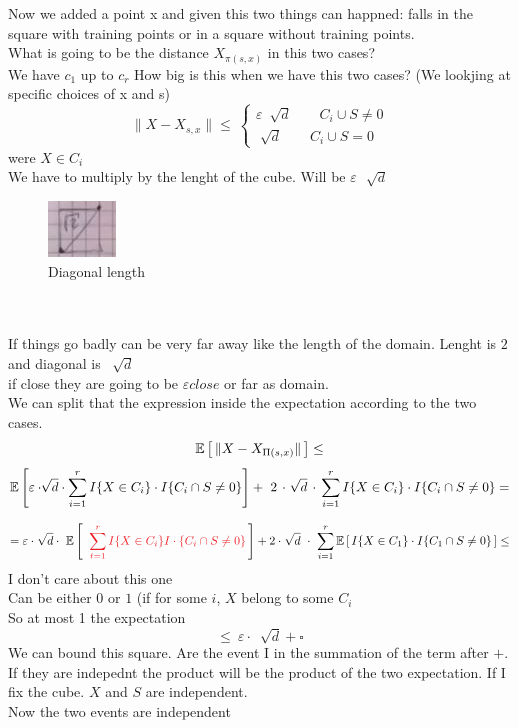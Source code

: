 \documentclass[../main.tex]{subfiles}
\begin{document}
Now we added a point x and given this two things can happned:
falls in the square with training points or in a square without training points.
\\
What is going to be the distance $X_{\pi(s,x)}$ in this two cases?
\\
We have $c_1$ up to $c_r$
How big is this when we have this two cases?
(We lookjing at specific choices of x and s)
\\
$$
\| X - X_{s,x} \| \leq \
\begin{cases}
\varepsilon \ \sqrt[]{d} \qquad C_i \cup S \neq 0 \\
\sqrt[]{d} \qquad C_i \cup S = 0
\end{cases}
$$
were $X \in C_i$
\\
We have to multiply by the lenght of the cube.
Will be $\varepsilon  \ \, \sqrt[]{d}$
\\
\begin{figure}[h]
    \centering
    \includegraphics[width=0.1\linewidth]{../img/lez11-img2.JPG}
    \caption{Diagonal length}
\end{figure}\\
\\
If things go badly can be very far away like the length of the domain.
Lenght is $2$ and diagonal is $ \ \sqrt[]{d}$
\\
if close they are going to be $\varepsilon close$ or far as domain.
\\
We can split that the expression inside the expectation according to the two cases.
\\
$$
\mathbb{E} \left[ \, \| X - X_{\Pi(s,x)} \| \, \right] 
\leq 
$$
$$
\mathbb{E} \left[ 
\varepsilon \cdot \sqrt[]{d} \cdot \sum_{i = 1}^{r} I \{ X \in C_i \}
\cdot 
I \{ C_i\cap S \neq 0 \} 
\right] 
+ \ 2 \, \cdot \
\sqrt[]{d} \, \cdot \,
\sum_{i=1}^{r} I \{ X \in C_i \} 
\cdot I\{C_i \cap S \neq 0 \} 
 =
$$

$$
= \varepsilon \cdot \ \sqrt[]{d} \cdot \ \barra{E} \left[ \, 
\bred{ $
\sum_{t = 1}^{r} I \{ X \in C_i \} I \cdot  \{C_i \cap S \neq 0 \}   $}\,  \right]
 + 2 \cdot \ \sqrt[]{d}\  \cdot \ \sum_{i = 1}^{r} 
\barra{E} \left[ \,
I \{ X \in C_1 \} 
\cdot 
I \{ C_1 \cap S \neq 0 \} \,
\right] \leq
$$
I don't care about this one  
\\
Can be either $0$ or $1$ (if for some $i$, $X$ belong to some $C_i$
\\
So at most 1 the expectation
$$
\leq \ \varepsilon \cdot \ \sqrt[]{d} + \square
$$
We can bound this square. Are the event I in the summation of the term after $+$. If they are indepednt the product will be the product of the two expectation. If I fix the cube.
$X$ and $S$ are independent.
\\
Now the two events are independent \\ 
\end{document}
